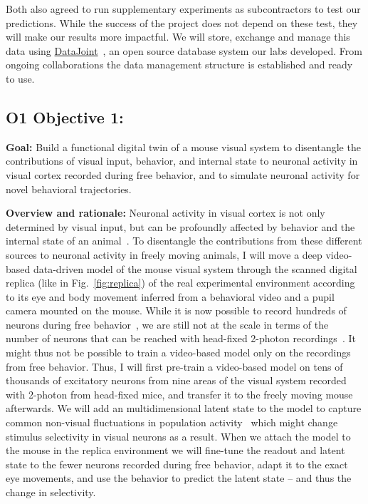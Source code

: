 \documentclass[B2,COG]{ercgrant}
\begin{document}
Both also agreed to run supplementary experiments as subcontractors to test our predictions.
While the success of the project does not depend on these test, they will make our results more impactful.
We will store, exchange and manage this data using \href{https://www.datajoint.org/}{DataJoint}~\parencite{Yatsenko2015-id}, an open source database system our labs developed. 
From ongoing collaborations the data management structure is established and ready to use.

\subsection{\colorbox{obj1}{\color{white}O1} Objective 1: \oonetitle}

\textbf{Goal:} Build a functional digital twin of a mouse visual system to disentangle the contributions of visual input, behavior, and internal state to neuronal activity in visual cortex recorded during free behavior, and to simulate neuronal activity for novel behavioral trajectories.

\textbf{Overview and rationale:} Neuronal activity  in visual cortex is not only determined by visual input, but can be profoundly affected by behavior and the internal state of an animal~\parencite{Niell2010-bs,Musall2019-kd,Stringer2019-lt, Franke2022-do}.
To disentangle the contributions from these different sources to neuronal activity in freely moving animals, I will move a deep video-based data-driven model of the mouse visual system through the scanned digital replica (like in Fig.~\ref{fig:replica}) of the real experimental environment according to its eye and body movement inferred from a behavioral video and a pupil camera mounted on the mouse. 
While it is now possible to record hundreds of neurons during free behavior~\parencite{Parker2022-ac}, we are still not at the scale in terms of the number of neurons that can be reached with head-fixed 2-photon recordings~\parencite{Sofroniew2016-xg}. 
It might thus not be possible to train a video-based model only on the recordings from free behavior. 
Thus, I will first pre-train a video-based model on tens of thousands of excitatory neurons from nine areas of the visual system recorded with 2-photon from head-fixed mice, and transfer it to the freely moving mouse afterwards.
We will add an multidimensional latent state to the model to capture common non-visual fluctuations in population activity~\parencite{Bashiri2021-or} which might change stimulus selectivity in visual neurons as a result.
When we attach the model to the mouse in the replica environment we will fine-tune the readout and latent state to the fewer neurons recorded during free behavior, adapt it to the exact eye movements, and use the behavior to predict  the latent state -- and thus the change in selectivity.
\end{document}
